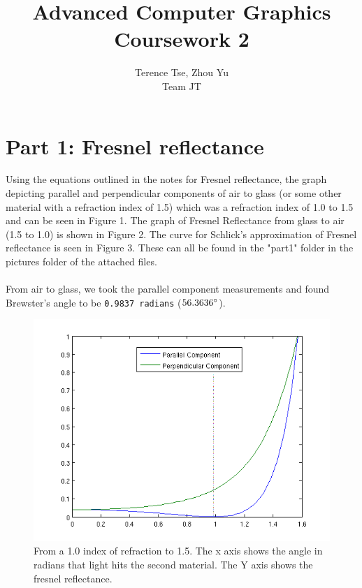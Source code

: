 \documentclass{article}
\begin{document}
\title{Advanced Computer Graphics\\ Coursework 2}
\author{Terence Tse, Zhou Yu \\ Team JT}
\maketitle
\newpage

\section{Part 1: Fresnel reflectance}
Using the equations outlined in the notes for Fresnel reflectance,
the graph depicting parallel and perpendicular components of air to glass
(or some other material with a refraction index of 1.5)
which was a refraction index of 1.0 to 1.5 and can be seen in Figure 1. The
graph of Fresnel Reflectance from glass to air (1.5 to 1.0) is shown in 
Figure 2. The curve for Schlick's approximation of Fresnel
reflectance is seen in Figure 3. These can all be found in the "part1" folder
in the pictures folder of the attached files.\\
\\
From air to glass, we took the parallel component measurements and found
Brewster's angle to be \texttt{0.9837 radians}  ($56.3636\degree$).

\begin{figure}[h]
	\centering
	\includegraphics[scale=0.5]{pics/part1/air2glass.png}
	\caption{From a 1.0 index of refraction to 1.5.
				The x axis shows the angle in radians that 
				light hits the second material. The Y axis
				shows the fresnel reflectance.}
\end{figure}
\end{document}
